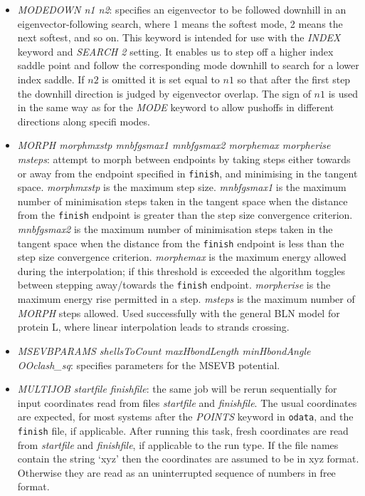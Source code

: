 \documentclass[12pt,a4paper,dvips]{article}
\begin{document}
\begin{itemize}
\item {\it MODEDOWN n1 n2\/}: specifies an eigenvector to be followed downhill in an eigenvector-following 
search, where 1 means the softest mode, 2 means the next softest, and so on.
This keyword is intended for use with the {\it INDEX\/} keyword and {\it SEARCH 2} setting.
It enables us to step off a higher index saddle point and follow the corresponding mode downhill
to search for a lower index saddle. If $n2$ is omitted it is set equal to $n1$
so that after the first step the downhill direction is judged by eigenvector overlap.
The sign of $n1$ is used in the same way as for the {\it MODE\/} keyword to allow pushoffs in
different directions along specifi modes.

\item {\it MORPH morphmxstp mnbfgsmax1 mnbfgsmax2 morphemax morpherise msteps\/}:
attempt to morph between endpoints by taking steps either towards or away from the
endpoint specified in {\tt finish}, and minimising in the tangent space.
{\it morphmxstp\/} is the maximum step size.
{\it mnbfgsmax1\/} is the maximum number of minimisation steps taken in the tangent
space when the distance from the {\tt finish} endpoint is greater than the 
step size convergence criterion.
{\it mnbfgsmax2\/} is the maximum number of minimisation steps taken in the tangent
space when the distance from the {\tt finish} endpoint is less than the
step size convergence criterion.
{\it morphemax\/} is the maximum energy allowed during the interpolation; 
if this threshold is exceeded the algorithm toggles between stepping away/towards
the {\tt finish} endpoint.
{\it morpherise\/} is the maximum energy rise permitted in a step.
{\it msteps\/} is the maximum number of {\it MORPH\/} steps allowed.
Used successfully with the general BLN model for protein L, where linear
interpolation leads to strands crossing.


\item {\it MSEVBPARAMS shellsToCount maxHbondLength minHbondAngle OOclash\_sq\/}: 
specifies parameters for the MSEVB potential.

\item {\it MULTIJOB startfile finishfile\/}: the same job will be rerun sequentially
for input coordinates read from files {\it startfile\/} and {\it finishfile\/}.
The usual coordinates are expected, for most systems after the {\it POINTS\/}
keyword in {\tt odata}, and the {\tt finish} file, if applicable.
After running this task, fresh coordinates are read from {\it startfile\/}
and {\it finishfile\/}, if applicable to the run type.
If the file names contain the string `xyz' then the coordinates are assumed to
be in xyz format. Otherwise they are read as an uninterrupted sequence of numbers
in free format.


\end{itemize}
\end{document}
